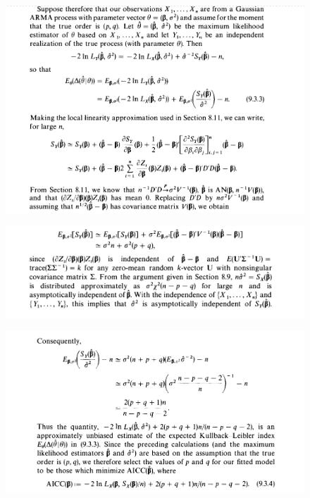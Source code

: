 \begin{figure}[H]
    \centering
    \includegraphics[width=1\textwidth]{../pictures/image11.png}
\end{figure}

\begin{figure}[H]
    \centering
    \includegraphics[width=1\textwidth]{../pictures/image12.png}
\end{figure}

\begin{figure}[H]
    \centering
    \includegraphics[width=1\textwidth]{../pictures/image13.png}
\end{figure}